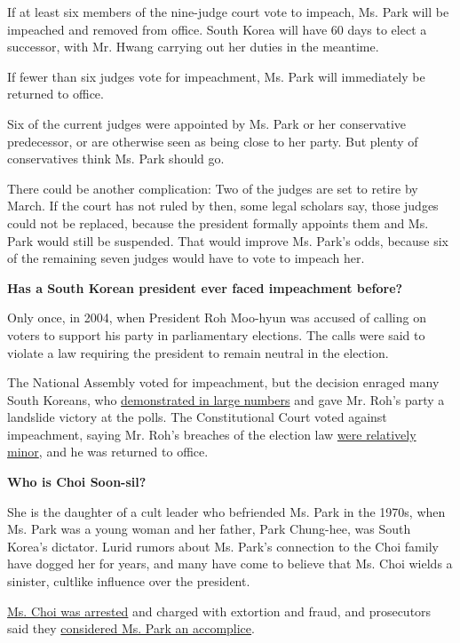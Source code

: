 If at least six members of the nine-judge court vote to impeach, Ms.
Park will be impeached and removed from office. South Korea will have 60
days to elect a successor, with Mr. Hwang carrying out her duties in the
meantime.

If fewer than six judges vote for impeachment, Ms. Park will immediately
be returned to office.

Six of the current judges were appointed by Ms. Park or her conservative
predecessor, or are otherwise seen as being close to her party. But
plenty of conservatives think Ms. Park should go.

There could be another complication: Two of the judges are set to retire
by March. If the court has not ruled by then, some legal scholars say,
those judges could not be replaced, because the president formally
appoints them and Ms. Park would still be suspended. That would improve
Ms. Park's odds, because six of the remaining seven judges would have to
vote to impeach her.

\textbf{Has a South Korean president ever faced impeachment before?}

Only once, in 2004, when President Roh Moo-hyun was accused of calling
on voters to support his party in parliamentary elections. The calls
were said to violate a law requiring the president to remain neutral in
the election.

The National Assembly voted for impeachment, but the decision enraged
many South Koreans, who
\href{http://www.nytimes.com/2004/03/13/world/president-s-impeachment-stirs-angry-protests-in-south-korea.html}{demonstrated
in large numbers} and gave Mr. Roh's party a landslide victory at the
polls. The Constitutional Court voted against impeachment, saying Mr.
Roh's breaches of the election law
\href{http://www.nytimes.com/2004/05/14/world/constitutional-court-reinstates-south-korea-s-impeached-president.html}{were
relatively minor}, and he was returned to office.

\textbf{Who is Choi Soon-sil?}

She is the daughter of a cult leader who befriended Ms. Park in the
1970s, when Ms. Park was a young woman and her father, Park Chung-hee,
was South Korea's dictator. Lurid rumors about Ms. Park's connection to
the Choi family have dogged her for years, and many have come to believe
that Ms. Choi wields a sinister, cultlike influence over the president.

\href{http://www.nytimes.com/2016/11/01/world/asia/south-korea-park-geun-hye-choi-soon-sil.html}{Ms.
Choi was arrested} and charged with extortion and fraud, and prosecutors
said they
\href{http://www.nytimes.com/2016/11/20/world/asia/park-geun-hye-south-korea-extortion-accomplice-prosecutors.html}{considered
Ms. Park an accomplice}.

